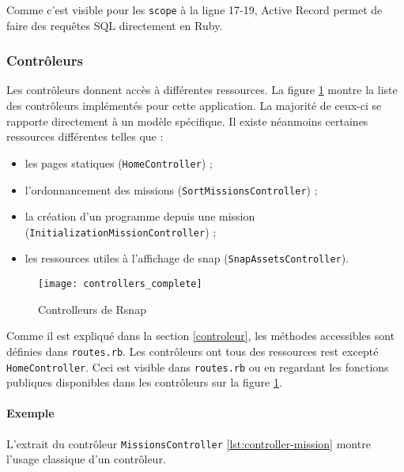 Comme c'est visible pour les \lstinline[language=Rails]{scope} à la ligne 17-19, Active Record permet de faire des requêtes SQL directement en Ruby.
\begin{figure}

\end{figure}

\subsubsection{Contrôleurs}
Les contrôleurs donnent accès à différentes ressources. La figure \ref{fig:controllers} montre la liste des contrôleurs implémentés pour cette application. La majorité de ceux-ci se rapporte directement à un modèle spécifique. Il existe néanmoins certaines ressources différentes telles que :
\begin{itemize}
  \item les pages statiques (\texttt{HomeController}) ;
  \item l'ordonnancement des \glspl{mission} (\texttt{SortMissionsController}) ;
  \item la création d'un programme depuis une \gls{mission} (\texttt{InitializationMissionController}) ;
  \item les ressources utiles à l'affichage de \gls{snap} (\texttt{SnapAssetsController}).
\end{itemize}

\begin{figure}
 \begin{center}
   \texttt{[image: controllers\_complete]}
   \caption{Controlleurs de Rsnap}
   \label{fig:controllers}
 \end{center}
\end{figure}

Comme il est expliqué dans la section \ref{controleur}, les méthodes accessibles sont définies dans \texttt{routes.rb}. Les contrôleurs ont tous des ressources \gls{rest} excepté \texttt{HomeController}. Ceci est visible dans \texttt{routes.rb} ou en regardant les fonctions publiques disponibles dans les contrôleurs sur la figure \ref{fig:controllers}.

\paragraph{Exemple}
L'extrait du contrôleur \texttt{MissionsController} \ref{lst:controller-mission} montre l'usage classique d'un contrôleur.

